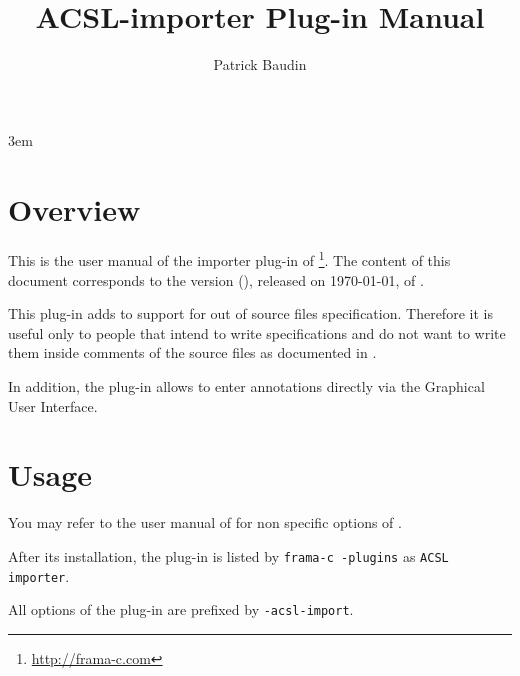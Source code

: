 \documentclass{frama-c-book}
\title{ACSL-importer Plug-in Manual}
\author{Patrick Baudin}
\newcommand{\FCVERSION}{(\unskip)}
\begin{document}
\sloppy
\emergencystretch 3em

\maketitle
\tableofcontents





\chapter{Overview}

This is the user manual of the \acsl\cite{acsl, acsl-implem} importer plug-in of
\FramaC\footnote{\url{http://frama-c.com}}. The content of this document
corresponds to the version \FCVERSION, released on \today, of \FramaC.

This plug-in adds to \FramaC support for out of \C source files
\acsl specification. Therefore it is useful only to people that
intend to write \acsl specifications and do not want to write them
inside comments of the \C source files as documented in \cite{acsl}.

In addition, the plug-in allows to enter \acsl annotations directly via the
Graphical User Interface.


\chapter{Usage}
You may refer to the user manual of \FramaC \cite{userman} for non
specific options of \FramaC.

After its installation, the plug-in is listed by \verb|frama-c -plugins|
as \verb|ACSL importer|.

All options of the plug-in are prefixed by \verb|-acsl-import|.
\end{document}
